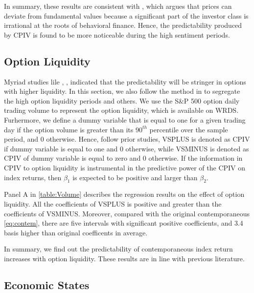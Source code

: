 In summary, these results are consistent with \textcite{baker2006investor}, which argues that prices can deviate from fundamental values because a significant part of the investor class is irrational at the roots of behavioral finance. Hence, the predictability produced by CPIV is found to be more noticeable during the high sentiment periods.  

\subsection{Option Liquidity}

Myriad studies lile \textcite{easley1998option}, \textcite{cremers2010deviations}, \textcite{driessen2012option} indicated that the predictability will be stringer in options with higher liquidity. In this section, we also follow the method in \textcite{chang2018implied} to segregate the high option liquidity periods and others. We use the S\&P 500 option daily trading volume to represent the option liquidity, which is available on WRDS. Furhermore, we define a dummy variable that is equal to one for a given trading day if the option volume is greater than its $90^{th}$ percentile over the sample period, and 0 otherwise. Hence, follow prior studies, VSPLUS is denoted as CPIV if dummy variable is equal to one and 0 otherwise, while VSMINUS is denoted as CPIV of dummy variable is equal to zero and 0 otherwise. If the information in CPIV to option liquidity is instrumental in the predictive power of the CPIV on index returns, then $\beta _{1}$ is expected to be positive and larger than $\beta _{2}$.

Panel A in \autoref{table:Volume} describes the regression results on the effect of option liquidity. All the coefficients of VSPLUS is positive and greater than the coefficients of VSMINUS. Moreover, compared with the original contemporaneous \autoref{eq:contem}, there are five intervals with significant positive coefficients, and 3.4 basis higher than original coefficents in average. 

In summary, we find out the predictability of contemporaneous index return increases with option liquidity. These results are in line with previous literature. 

\subsection{Economic States}














